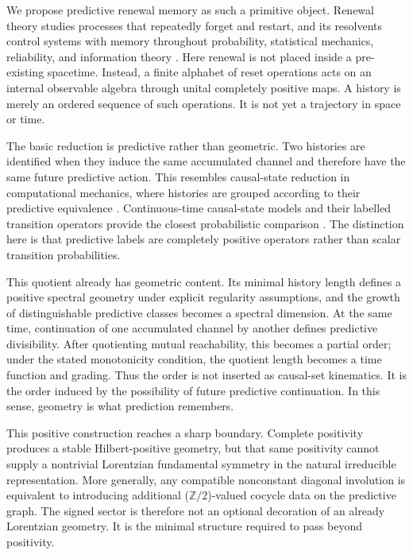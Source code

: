 \documentclass[11pt]{article}
\theoremstyle{definition}
\theoremstyle{remark}
\newcommand{\Z}{\mathbb{Z}}
\begin{document}
We propose predictive renewal memory as such a primitive object.  Renewal
theory studies processes that repeatedly forget and restart, and its
resolvents control systems with memory throughout probability, statistical
mechanics, reliability, and information theory \cite{feller}.  Here renewal
is not placed inside a pre-existing spacetime.  Instead, a finite alphabet of
reset operations acts on an internal observable algebra through unital
completely positive maps.  A history is merely an ordered sequence of such
operations.  It is not yet a trajectory in space or time.

The basic reduction is predictive rather than geometric.  Two histories are
identified when they induce the same accumulated channel and therefore have
the same future predictive action.  This resembles causal-state reduction in
computational mechanics, where histories are grouped according to their
predictive equivalence
\cite{shalizicrutchfield,TraversCrutchfield2014}.  Continuous-time
causal-state models and their labelled transition operators provide the
closest probabilistic comparison
\cite{MarzenCrutchfield2017,Marzen2018MWC,
RiechersCrutchfield2017a,RiechersCrutchfield2017b,
LoomisCrutchfield2019}.  The distinction here is that predictive labels are
completely positive operators rather than scalar transition probabilities.

This quotient already has geometric content.  Its minimal history length
defines a positive spectral geometry under explicit regularity assumptions,
and the growth of distinguishable predictive classes becomes a spectral
dimension.  At the same time, continuation of one accumulated channel by
another defines predictive divisibility.  After quotienting mutual
reachability, this becomes a partial order; under the stated monotonicity
condition, the quotient length becomes a time function and grading.  Thus the
order is not inserted as causal-set kinematics.  It is the order induced by
the possibility of future predictive continuation.  In this sense, geometry
is what prediction remembers.

This positive construction reaches a sharp boundary.  Complete positivity
produces a stable Hilbert-positive geometry, but that same positivity cannot
supply a nontrivial Lorentzian fundamental symmetry in the natural
irreducible representation.  More generally, any compatible nonconstant
diagonal involution is equivalent to introducing additional
($\Z/2$)-valued cocycle data on the predictive graph.  The signed sector is
therefore not an optional decoration of an already Lorentzian geometry.  It
is the minimal structure required to pass beyond positivity.
\end{document}
